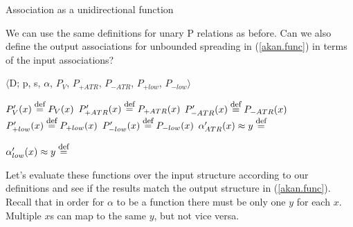 \documentclass[,doc,floatsintext]{apa6}
\def\defeq{\mathrel{\buildrel \mbox{\footnotesize def} \over =}}
\theoremstyle{definition}
\theoremstyle{definition}
\theoremstyle{definition}
\theoremstyle{remark}
\begin{document}
\begin{exe}
\ex \label{akan.func} Association as a unidirectional function \\
\end{exe}

\noindent We can use the same definitions for unary P relations as
before. Can we also define the output associations for unbounded
spreading in (\ref{akan.func}) in terms of the input associations?

\begin{exe}
\ex\label{function.spread} $\langle$D; p, s, $\alpha$, $P_V$, $P_{+ATR}$, $P_{-ATR}$, $P_{+low}$, $P_{-low}\rangle$ 
\end{exe}

\noindent \(P'_{V}(x) \defeq P_{V}(x)\)\newline
\(P'_{+ATR}(x) \defeq P_{+ATR}(x)\) \hspace{0.5in}
\(P'_{-ATR}(x) \defeq P_{-ATR}(x)\)\newline
\(P'_{+low}(x) \defeq P_{+low}(x)\) \hspace{0.5in}
\(P'_{-low}(x) \defeq P_{-low}(x)\)\newline
\(\alpha_{ATR}'(x)\approx y \defeq\) \vspace{1in}

\noindent \(\alpha_{low}'(x)\approx y \defeq\)

\newpage

\noindent Let's evaluate these functions over the input structure
according to our definitions and see if the results match the output
structure in (\ref{akan.func}). Recall that in order for \(\alpha\) to
be a function there must be only one \(y\) for each \(x\). Multiple
\(x\)s can map to the same \(y\), but not vice versa.
\end{document}

